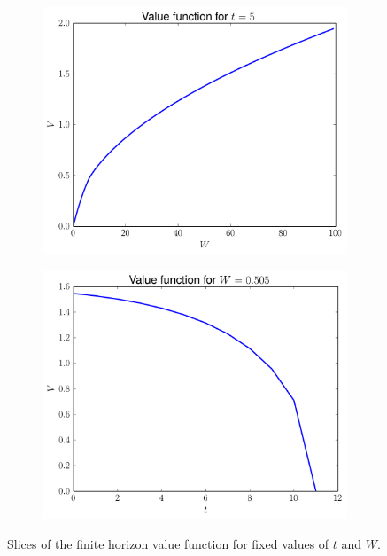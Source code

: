\begin{figure}
\begin{subfigure}{.5\textwidth}
    \includegraphics[width=\textwidth]{fixed_time.pdf}
\end{subfigure}
\begin{subfigure}{.5\textwidth}
    \includegraphics[width=\textwidth]{fixed_w.pdf}
\end{subfigure}
\caption{Slices of the finite horizon value function for fixed values of $t$ and $W$.}
\label{fig:valueslices}
\end{figure}

